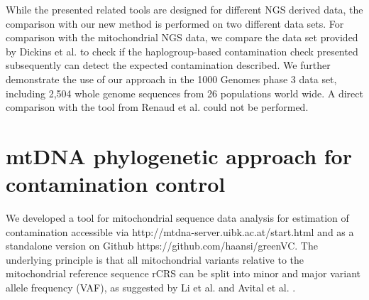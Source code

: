 While the presented related tools are designed for different NGS derived data, the comparison with our new method is performed on two different data sets. For comparison with the mitochondrial NGS data, we compare the data set provided by Dickins et al. \cite{Dickins2014} to check if the haplogroup-based contamination check presented subsequently can detect the expected contamination described. We further demonstrate the use of our approach in the 1000 Genomes phase 3 data set, including 2,504 whole genome sequences from 26 populations world wide. A direct comparison with the tool from Renaud et al. could not be performed.


\section{mtDNA phylogenetic approach for contamination control}\label{haplochecker}
We developed a tool for mitochondrial sequence data analysis for estimation of contamination accessible via http://mtdna-server.uibk.ac.at/start.html and as a standalone version on Github https://github.com/haansi/greenVC. The underlying principle is that all mitochondrial variants relative to the mitochondrial reference sequence rCRS \cite{Andrews1999} can be split into minor and major variant allele frequency (VAF), as suggested by Li et al. \cite{Li2010} and Avital et al. \cite{Avital2012}.
